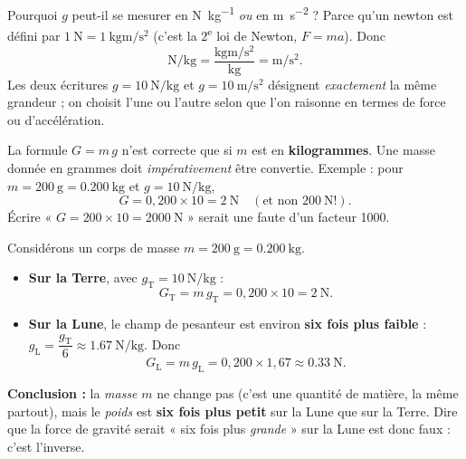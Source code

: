 \documentclass[11pt,a4paper]{article}
\begin{document}
\begin{remarque}
Pourquoi $g$ peut-il se mesurer en \si{\newton\per\kilogram} \emph{ou} en \si{\metre\per\second\squared} ?
Parce qu'un newton est défini par $\SI{1}{\newton}=\SI{1}{\kilogram\metre\per\second\squared}$
(c'est la 2\textsuperscript{e} loi de Newton, $F=ma$). Donc
\[
\si{\newton\per\kilogram}
= \frac{\si{\kilogram\metre\per\second\squared}}{\si{\kilogram}}
= \si{\metre\per\second\squared}.
\]
Les deux écritures $g=\SI{10}{\newton\per\kilogram}$ et $g=\SI{10}{\metre\per\second\squared}$
désignent \emph{exactement} la même grandeur ; on choisit l'une ou l'autre selon que l'on raisonne
en termes de force ou d'accélération.
\end{remarque}

\begin{attention}
La formule $G=m\,g$ n'est correcte que si $m$ est en \textbf{kilogrammes}. Une masse donnée en
grammes doit \emph{impérativement} être convertie. Exemple : pour $m=\SI{200}{\gram}=\SI{0.200}{\kilogram}$
et $g=\SI{10}{\newton\per\kilogram}$,
\[
G = 0{,}200 \times 10 = \SI{2}{\newton}\quad(\text{et non } \SI{200}{\newton}!).
\]
Écrire « $G = 200 \times 10 = \SI{2000}{\newton}$ » serait une faute d'un facteur 1000.
\end{attention}

\begin{exemple}
Considérons un corps de masse $m = \SI{200}{\gram} = \SI{0.200}{\kilogram}$.
\begin{itemize}[leftmargin=1.6em,topsep=2pt,itemsep=2pt]
  \item \textbf{Sur la Terre}, avec $g_{\text{T}}=\SI{10}{\newton\per\kilogram}$ :
        \[ G_{\text{T}} = m\,g_{\text{T}} = 0{,}200 \times 10 = \SI{2}{\newton}. \]
  \item \textbf{Sur la Lune}, le champ de pesanteur est environ \textbf{six fois plus faible} :
        $g_{\text{L}} = \dfrac{g_{\text{T}}}{6} \approx \SI{1.67}{\newton\per\kilogram}$. Donc
        \[ G_{\text{L}} = m\,g_{\text{L}} = 0{,}200 \times 1{,}67 \approx \SI{0.33}{\newton}. \]
\end{itemize}
\textbf{Conclusion :} la \emph{masse} $m$ ne change pas (c'est une quantité de matière, la même
partout), mais le \emph{poids} est \textbf{six fois plus petit} sur la Lune que sur la Terre. Dire que la
force de gravité serait « six fois plus \emph{grande} » sur la Lune est donc faux : c'est l'inverse.
\end{exemple}
\end{document}
